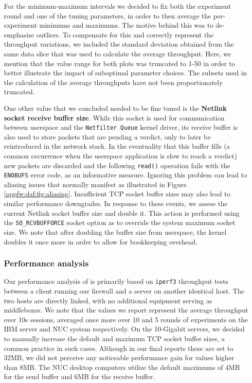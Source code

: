 For the minimum-maximum intervals we decided to fix both the experiment round and one of the tuning parameters, in order to then average the per-experiment minimums and maximums. The motive behind this was to de-emphasize outliers. To compensate for this and correctly represent the throughput variations, we included the standard deviation obtained from the same data slice that was used to calculate the average throughput. Here, we mention that the value range for both plots was truncated to 1-50 in order to better illustrate the impact of suboptimal parameter choices. The subsets used in the calculation of the average throughputs have not been proportionately truncated.



One other value that we concluded needed to be fine tuned is the \textbf{Netlink socket receive buffer size}. While this socket is used for communication between userspace and the \texttt{Netfilter Queue} kernel driver, its receive buffer is also used to store packets that are pending a verdict, only to later be reintroduced in the network stack. In the eventuality that this buffer fills (a common occurrence when the userspace application is slow to reach a verdict) new packets are discarded and the following \texttt{read()} operation fails with the \texttt{ENOBUFS} error code, as an informative measure. Ignoring this problem can lead to aliasing issues that normally manifest as illustrated in Figure \ref{appfw:daf:fig:aliasing}. Insufficient TCP socket buffer sizes may also lead to similar performance downgrades. In response to these events, we assess the current Netlink socket buffer size and double it. This action is performed using the \texttt{SO\_RCVBUFFORCE} socket option as to override the system maximum socket size. We note that after doubling the buffer size from userspace, the kernel doubles it once more in order to allow for bookkeeping overhead.

\subsubsection{Performance analysis}

Our performance analysis of \daf{} is primarily based on \texttt{iperf3} throughput tests between a client running our firewall and a server on another identical host. The two hosts are directly linked, with no additional equipment serving as middleboxes. We note that the values we report represent the average throughput over 10s sessions, averaged once more over 10 and 5 rounds of experiments on the IBM server and NUC system respectively. On the 10-Gigabit servers, we decided to manually increase the default and maximum TCP socket buffer sizes, a common practice in such cases. Although in our final reports these are set to 32MB, we did not perceive any noticeable performance gain for values higher than 8MB. The NUC desktop computers utilize the default maximums of 4MB for the send buffer and 6MB for the receive buffer.


